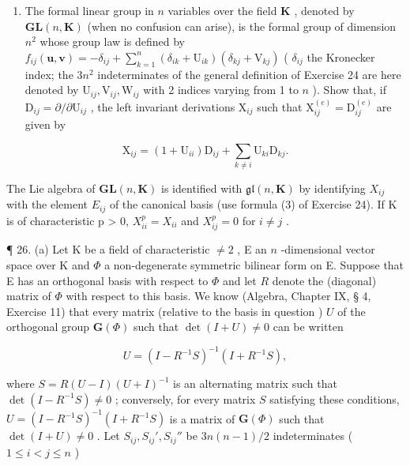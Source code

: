 \begin{enumerate}
\def\labelenumi{\arabic{enumi}.}
\setcounter{enumi}{24}
\tightlist
\item
  The formal linear group in \(n\) variables over the field \(\mathbf{K}\) , denoted by \(\mathbf{GL}(n, \mathbf{K})\) (when no confusion can arise), is the formal group of dimension \(n^2\) whose group law is defined by \(f_{ij}(\mathbf{u}, \mathbf{v}) = -\delta_{ij} + \sum_{k=1}^{n} (\delta_{ik} + \mathrm{U}_{ik})(\delta_{kj} + \mathrm{V}_{kj})\) ( \(\delta_{ij}\) the Kronecker index; the \(3n^2\) indeterminates of the general definition of Exercise 24 are here denoted by \(\mathrm{U}_{ij}, \mathrm{V}_{ij}, \mathrm{W}_{ij}\) with 2 indices varying from 1 to \(n\) ). Show that, if \(\mathrm{D}_{ij} = \partial/\partial \mathrm{U}_{ij}\) , the left invariant derivations \(\mathrm{X}_{ij}\) such that \(\mathrm{X}_{ij}^{(e)} = \mathrm{D}_{ij}^{(e)}\) are given by
\end{enumerate}

\[
\mathrm{X} _ {i j} = (1 + \mathrm{U} _ {i i}) \mathrm{D} _ {i j} + \sum_ {k \neq i} \mathrm{U} _ {k i} \mathrm{D} _ {k j}.
\]

The Lie algebra of \(\mathbf{GL}(n,\mathbf{K})\) is identified with \(\mathfrak{gl}(n,\mathbf{K})\) by identifying \(X_{ij}\) with the element \(E_{ij}\) of the canonical basis (use formula (3) of Exercise 24). If K is of characteristic p \textgreater{} 0, \(X_{ii}^{p} = X_{ii}\) and \(X_{ij}^{p} = 0\) for \(i \neq j\) .

¶ 26. (a) Let K be a field of characteristic \(\neq 2\) , E an \(n\) -dimensional vector space over K and \(\Phi\) a non-degenerate symmetric bilinear form on E. Suppose that E has an orthogonal basis with respect to \(\Phi\) and let \(R\) denote the (diagonal) matrix of \(\Phi\) with respect to this basis. We know (Algebra, Chapter IX, § 4, Exercise 11) that every matrix (relative to the basis in question ) \(U\) of the orthogonal group \(\mathbf{G}(\Phi)\) such that \(\det(I + U) \neq 0\) can be written

\[
U = (I - R ^ {- 1} S) ^ {- 1} (I + R ^ {- 1} S),
\]

  where \(S = R(U - I)(U + I)^{-1}\) is an alternating matrix such that \(\det(I - R^{-1}S) \neq 0\) ; conversely, for every matrix \(S\) satisfying these conditions, \(U = (I - R^{-1}S)^{-1}(I + R^{-1}S)\) is a matrix of \(\mathbf{G}(\Phi)\) such that \(\det(I + U) \neq 0\) . Let \(S_{ij}, S_{ij}', S_{ij}''\) be \(3n(n - 1)/2\) indeterminates ( \(1 \leqslant i < j \leqslant n\) )

